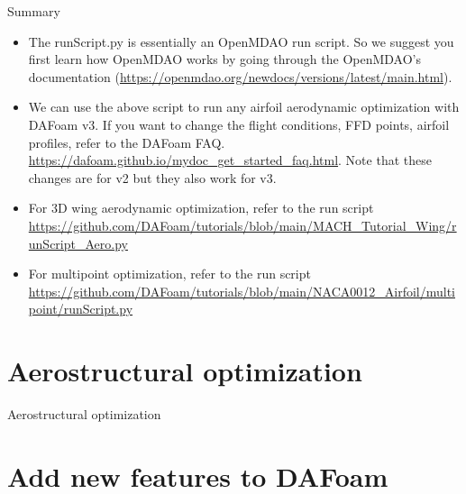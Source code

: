 \documentclass{bredelebeamer}
\begin{document}
\begin{frame}[fragile]{Summary}
    \begin{itemize}
      \setlength\itemsep{1em}
      \item The runScript.py is essentially an OpenMDAO run script. So we suggest you first learn how OpenMDAO works by going through the OpenMDAO's documentation (\url{https://openmdao.org/newdocs/versions/latest/main.html}).
     \item We can use the above script to run any airfoil aerodynamic optimization with DAFoam v3. If you want to change the flight conditions, FFD points, airfoil profiles, refer to the DAFoam FAQ. \url{https://dafoam.github.io/mydoc_get_started_faq.html}. Note that these changes are for v2 but they also work for v3.
     \item For 3D wing aerodynamic optimization, refer to the run script \url{https://github.com/DAFoam/tutorials/blob/main/MACH_Tutorial_Wing/runScript_Aero.py}
     \item For multipoint optimization, refer to the run script \url{https://github.com/DAFoam/tutorials/blob/main/NACA0012_Airfoil/multipoint/runScript.py}
    \end{itemize}
  \end{frame}
  

\section{Aerostructural optimization}
\renewcommand{\arraystretch}{2}

\begin{frame}{}
  \center \Large Aerostructural optimization
\end{frame}


\section{Add new features to DAFoam}
\renewcommand{\arraystretch}{2}
\end{document}

